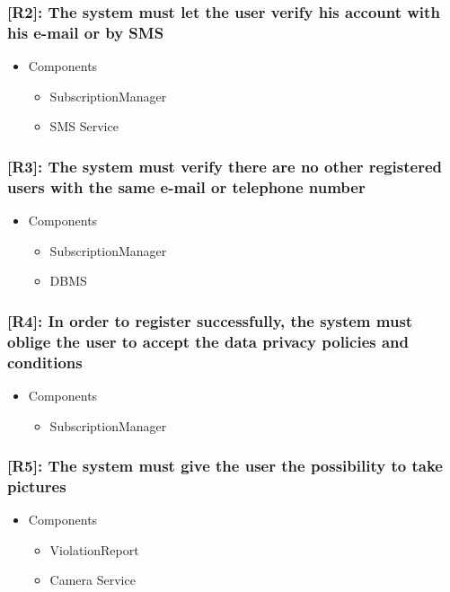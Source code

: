\documentclass[12pt,a4paper]{article}
\begin{document}
\subsubsection*{[R2]: The system must let the user verify his account with his e-mail or by SMS}
\begin{itemize}
\item Components
\begin{itemize}
\item SubscriptionManager
\item SMS Service
\end{itemize}
\end{itemize}
\subsubsection*{[R3]: The system must verify there are no other registered users with the same e-mail or telephone number}
\begin{itemize}
\item Components
\begin{itemize}
\item SubscriptionManager
\item DBMS
\end{itemize}
\end{itemize}
\subsubsection*{[R4]: In order to register successfully, the system must oblige the user to accept the data privacy policies and conditions}
\begin{itemize}
\item Components
\begin{itemize}
\item SubscriptionManager
\end{itemize}
\end{itemize}
\subsubsection*{[R5]: The system must give the user the possibility to take pictures}
\begin{itemize}
\item Components
\begin{itemize}
\item ViolationReport
\item Camera Service
\end{itemize}
\end{itemize}
\end{document}
